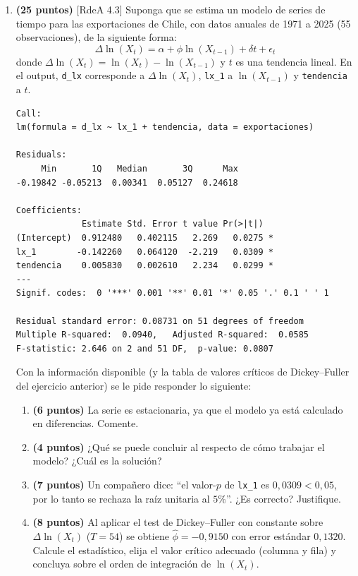 \documentclass[12pt,letterpaper]{article}
\newcommand{\rdea}[1]{\textsf{\small [RdeA #1]}}
\begin{document}
\begin{enumerate}
\item \textbf{(25 puntos)} \rdea{4.3}
Suponga que se estima un modelo de series de tiempo para las exportaciones de Chile,
con datos anuales de 1971 a 2025 (55 observaciones), de la siguiente forma:
\[
\Delta \ln(X_t) = \alpha + \phi \ln(X_{t-1}) + \delta t + \epsilon_t
\]
donde $\Delta \ln(X_t) = \ln(X_t) - \ln(X_{t-1})$ y $t$ es una tendencia lineal.
En el output, \texttt{d\_lx} corresponde a $\Delta \ln(X_t)$, \texttt{lx\_1} a
$\ln(X_{t-1})$ y \texttt{tendencia} a $t$.

\begin{lstlisting}[style=Rout]
Call:
lm(formula = d_lx ~ lx_1 + tendencia, data = exportaciones)

Residuals:
     Min       1Q   Median       3Q      Max
-0.19842 -0.05213  0.00341  0.05127  0.24618

Coefficients:
             Estimate Std. Error t value Pr(>|t|)
(Intercept)  0.912480   0.402115   2.269   0.0275 *
lx_1        -0.142260   0.064120  -2.219   0.0309 *
tendencia    0.005830   0.002610   2.234   0.0299 *
---
Signif. codes:  0 '***' 0.001 '**' 0.01 '*' 0.05 '.' 0.1 ' ' 1

Residual standard error: 0.08731 on 51 degrees of freedom
Multiple R-squared:  0.0940,   Adjusted R-squared:  0.0585
F-statistic: 2.646 on 2 and 51 DF,  p-value: 0.0807
\end{lstlisting}

Con la información disponible (y la tabla de valores críticos de Dickey--Fuller del ejercicio anterior) se le pide responder lo siguiente:

\begin{enumerate}
    \item [a)] \textbf{(6 puntos)} La serie es estacionaria, ya que el modelo ya está calculado en diferencias. Comente.
    \item [b)] \textbf{(4 puntos)} ¿Qué se puede concluir al respecto de cómo trabajar el modelo? ¿Cuál es la solución?
    \item [c)] \textbf{(7 puntos)} Un compañero dice: ``el valor-$p$ de \texttt{lx\_1} es $0{,}0309<0{,}05$, por lo tanto se rechaza la raíz unitaria al $5\%$''. ¿Es correcto? Justifique.
    \item [d)] \textbf{(8 puntos)} Al aplicar el test de Dickey--Fuller con constante sobre $\Delta \ln(X_t)$ ($T=54$) se obtiene $\hat\phi=-0{,}9150$ con error estándar $0{,}1320$. Calcule el estadístico, elija el valor crítico adecuado (columna y fila) y concluya sobre el orden de integración de $\ln(X_t)$.
\end{enumerate}


\end{enumerate}
\end{document}
